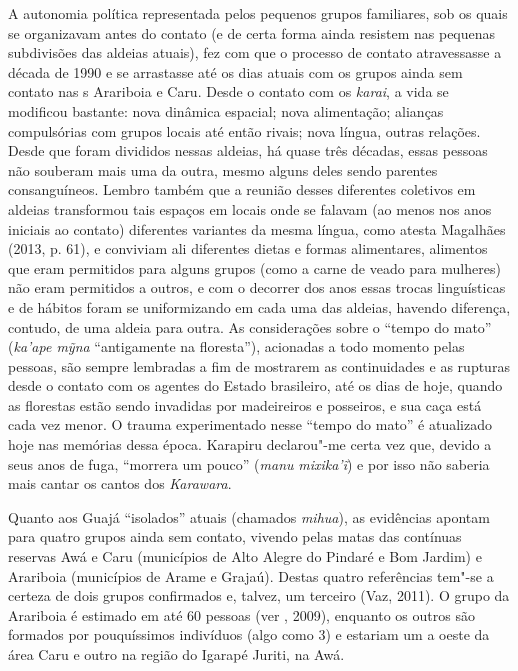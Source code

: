 A autonomia política representada pelos pequenos grupos familiares, sob
os quais se organizavam antes do contato (e de certa forma ainda
resistem nas pequenas subdivisões das aldeias atuais), fez com que o
processo de contato atravessasse a década de 1990 e se arrastasse até os
dias atuais com os grupos ainda sem contato nas s Arariboia e Caru.
Desde o contato com os \emph{karai}, a vida se modificou bastante: nova
dinâmica espacial; nova alimentação; alianças compulsórias com grupos
locais até então rivais; nova língua, outras relações. Desde que foram
divididos nessas aldeias, há quase três décadas, essas pessoas não
souberam mais uma da outra, mesmo alguns deles sendo parentes
consanguíneos. Lembro também que a reunião desses diferentes coletivos
em aldeias transformou tais espaços em locais onde se falavam (ao menos
nos anos iniciais ao contato) diferentes variantes da mesma língua, como
atesta Magalhães (2013, p. 61), e conviviam ali diferentes dietas e
formas alimentares, alimentos que eram permitidos para alguns grupos
(como a carne de veado para mulheres) não eram permitidos a outros, e
com o decorrer dos anos essas trocas linguísticas e de hábitos foram se
uniformizando em cada uma das aldeias, havendo diferença, contudo, de
uma aldeia para outra. As considerações sobre o ``tempo do mato''
(\emph{ka'ape mỹna} ``antigamente na floresta''), acionadas a todo
momento pelas pessoas, são sempre lembradas a fim de mostrarem as
continuidades e as rupturas desde o contato com os agentes do Estado
brasileiro, até os dias de hoje, quando as florestas estão sendo
invadidas por madeireiros e posseiros, e sua caça está cada vez menor. O
trauma experimentado nesse ``tempo do mato'' é atualizado hoje nas
memórias dessa época. Karapiru declarou"-me certa vez que, devido a seus
anos de fuga, ``morrera um pouco'' (\emph{manu} \emph{mixika'ĩ}) e por
isso não saberia mais cantar os cantos dos \emph{Karawara}.

Quanto aos Guajá ``isolados'' atuais (chamados \emph{mihua}), as
evidências apontam para quatro grupos ainda sem contato, vivendo pelas
matas das contínuas reservas Awá e Caru (municípios de Alto Alegre do
Pindaré e Bom Jardim) e Arariboia (municípios de Arame e Grajaú). Destas
quatro referências tem"-se a certeza de dois grupos confirmados e,
talvez, um terceiro (Vaz, 2011). O grupo da  Arariboia é estimado em
até 60 pessoas (ver , 2009), enquanto os outros são formados por
pouquíssimos indivíduos (algo como 3) e estariam um a oeste da área Caru
e outro na região do Igarapé Juriti, na  Awá.

